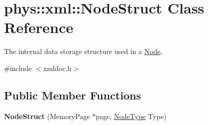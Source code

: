 \hypertarget{structphys_1_1xml_1_1NodeStruct}{
\section{phys::xml::NodeStruct Class Reference}
\label{d7/dd5/structphys_1_1xml_1_1NodeStruct}
}


The internal data storage structure used in a \hyperlink{classphys_1_1xml_1_1Node}{Node}.  




{\ttfamily \#include $<$xmldoc.h$>$}

\subsection*{Public Member Functions}
\begin{DoxyCompactItemize}
\item 
\hypertarget{structphys_1_1xml_1_1NodeStruct_af6a5de2fa7cd6f0d35ea4df2db7e9deb}{
{\bfseries NodeStruct} (MemoryPage $\ast$page, \hyperlink{namespacephys_1_1xml_a668b0cc666a9d49f7c7222a7552115d3}{NodeType} Type)}
\label{d7/dd5/structphys_1_1xml_1_1NodeStruct_af6a5de2fa7cd6f0d35ea4df2db7e9deb}

\end{DoxyCompactItemize}

